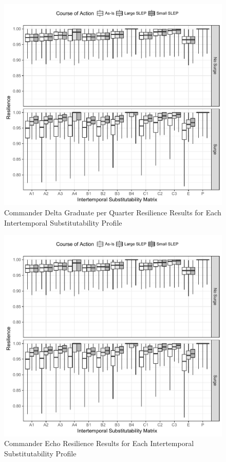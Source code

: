 \documentclass[preprint,12pt]{elsarticle}
\begin{document}
\begin{figure}[h]
  \centering\includegraphics{CDR_Delta_GradRes}
  \caption{Commander Delta Graduate per Quarter Resilience Results for
  Each Intertemporal Substitutability Profile}
  \label{f:CO_D_Grad}
\end{figure}

\begin{figure}[h]
  \centering\includegraphics{CDR_Echo_GradRes}
  \caption{Commander Echo Resilience Results for
  Each Intertemporal Substitutability Profile}
  \label{f:CO_E_Grad}
\end{figure}
\end{document}
